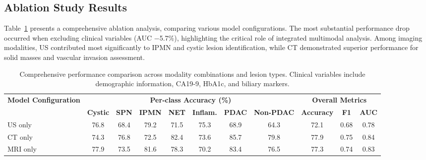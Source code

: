 \documentclass[a4paper, fleqn]{cas-dc}
\begin{document}
    \subsection{Ablation Study Results}
    Table~\ref{tab:ablation} presents a comprehensive ablation analysis, comparing
    various model configurations. The most substantial performance drop occurred
    when excluding clinical variables (AUC $-$5.7\%), highlighting the critical role
    of integrated multimodal analysis. Among imaging modalities, US contributed most
    significantly to IPMN and cystic lesion identification, while CT
    demonstrated superior performance for solid masses and vascular invasion
    assessment.

    \begin{table}[htbp]
        \centering
        \caption{Comprehensive performance comparison across modality
        combinations and lesion types. Clinical variables include demographic information,
        CA19‑9, HbA1c, and biliary markers.}
        \label{tab:ablation} \tiny
        \begin{tabular*}{\tblwidth}{@{} l|ccccccc|ccc @{}}
            \toprule \multirow{2}{*}{\textbf{Model Configuration}} & \multicolumn{7}{c|}{\textbf{Per‐class Accuracy (\%)}} & \multicolumn{3}{c}{\textbf{Overall Metrics}} \\
            \cmidrule(lr){2-8} \cmidrule(lr){9-11}                 & \textbf{Cystic}                                       & \textbf{SPN}                                & \textbf{IPMN} & \textbf{NET}  & \textbf{Inflam.} & \textbf{PDAC} & \textbf{Non‑PDAC} & \textbf{Accuracy} & \textbf{F1}   & \textbf{AUC}  \\
            \midrule US only                                       & 76.8                                                  & 68.4                                        & 79.2          & 71.5          & 75.3             & 68.9          & 64.3              & 72.1              & 0.68          & 0.78          \\
            CT only                                                & 74.3                                                  & 76.8                                        & 72.5          & 82.4          & 73.6             & 85.7          & 79.8              & 77.9              & 0.75          & 0.84          \\
            MRI only                                               & 77.9                                                  & 73.5                                        & 81.6          & 78.3          & 70.2             & 83.4          & 76.5              & 77.3              & 0.74          & 0.83          \\

\end{tabular*}
\end{table}
\end{document}
